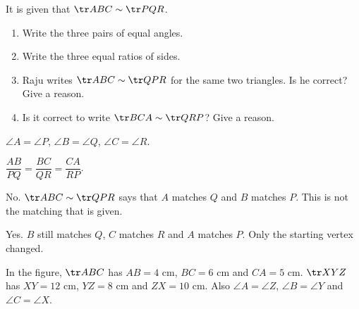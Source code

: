 \begin{solvefirst}
  \item It is given that $\tr ABC\sim\tr PQR$.
  \begin{enumerate}[label=(\alph*),itemsep=1pt]
    \item Write the three pairs of equal angles.
    \item Write the three equal ratios of sides.
    \item Raju writes $\tr ABC\sim\tr QPR$ for the same two triangles. Is he correct? Give a reason.
    \item Is it correct to write $\tr BCA\sim\tr QRP$? Give a reason.
  \end{enumerate}
\begin{solution}
\begin{steps}
  \item[(a)] $\angle A=\angle P$, $\angle B=\angle Q$, $\angle C=\angle R$.
  \item[(b)] $\dfrac{AB}{PQ}=\dfrac{BC}{QR}=\dfrac{CA}{RP}$.
  \item[(c)] No. $\tr ABC\sim\tr QPR$ says that $A$ matches $Q$ and $B$ matches $P$. This is not the matching that is given.
  \item[(d)] Yes. $B$ still matches $Q$, $C$ matches $R$ and $A$ matches $P$. Only the starting vertex changed.
\end{steps}
\end{solution}
  \item In the figure, $\tr ABC$ has $AB=4$ cm, $BC=6$ cm and $CA=5$ cm. $\tr XYZ$ has $XY=12$ cm, $YZ=8$ cm and $ZX=10$ cm. Also $\angle A=\angle Z$, $\angle B=\angle Y$ and $\angle C=\angle X$.
\end{solvefirst}
